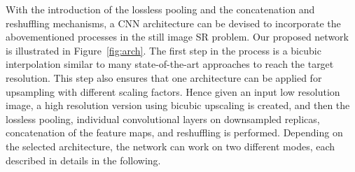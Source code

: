 \documentclass[10pt,twocolumn,letterpaper]{article}
\begin{document}

With the introduction of the lossless pooling and the concatenation and reshuffling mechanisms, a CNN architecture can 
be devised to incorporate the abovementioned processes in the still image SR problem. Our proposed network is illustrated 
in Figure~\ref{fig:arch}. The first step in the process is a bicubic interpolation similar to many state-of-the-art approaches
to reach the target resolution. This step also ensures that one architecture can be applied for upsampling with different 
scaling factors. Hence given an input low resolution image, a high resolution version using bicubic upscaling
is created, and then the lossless pooling, individual convolutional layers on downsampled replicas, concatenation of the feature maps, 
and reshuffling is performed. Depending on the selected architecture, the network can work on two different modes, each described
in details in the following.
\end{document}
